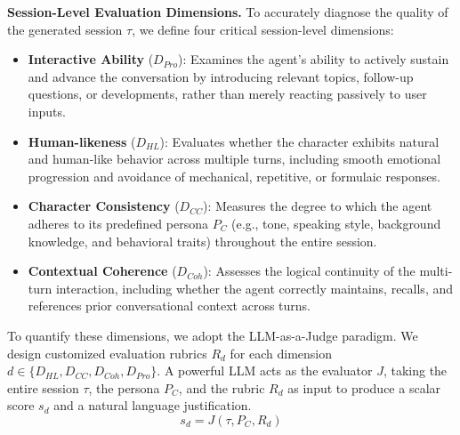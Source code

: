 \noindent \textbf{Session-Level Evaluation Dimensions.}
To accurately diagnose the quality of the generated session $\tau$, we define four critical session-level dimensions:
\begin{itemize}[leftmargin=*]
\item \textbf{Interactive Ability} ($D_{Pro}$): Examines the agent's ability to actively sustain and advance the conversation by introducing relevant topics, follow-up questions, or developments, rather than merely reacting passively to user inputs.

\item \textbf{Human-likeness} ($D_{HL}$): Evaluates whether the character exhibits natural and human-like behavior across multiple turns, including smooth emotional progression and avoidance of mechanical, repetitive, or formulaic responses.

\item \textbf{Character Consistency} ($D_{CC}$): Measures the degree to which the agent adheres to its predefined persona $P_C$ (e.g., tone, speaking style, background knowledge, and behavioral traits) throughout the entire session.

\item \textbf{Contextual Coherence} ($D_{Coh}$): Assesses the logical continuity of the multi-turn interaction, including whether the agent correctly maintains, recalls, and references prior conversational context across turns.
\end{itemize}

To quantify these dimensions, we adopt the LLM-as-a-Judge paradigm. We design customized evaluation rubrics $R_d$ for each dimension $d \in \{D_{HL}, D_{CC}, D_{Coh}, D_{Pro}\}$. A powerful LLM acts as the evaluator $J$, taking the entire session $\tau$, the persona $P_C$, and the rubric $R_d$ as input to produce a scalar score $s_d$ and a natural language justification.
\begin{equation}
    s_d = J(\tau, P_C, R_d)
\end{equation}

